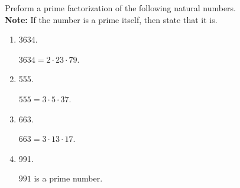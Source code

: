\documentclass[12pt]{article} %
\begin{document}
  \begin{qstn}
    Preform a prime factorization of the following natural numbers.\\
    \textbf{Note:} If the number is a prime itself, then state that it is.
    \begin{enumerate}[label=(\alph*)]
      \item 3634.
        \begin{solution}
          $3634 = 2 \cdot 23 \cdot  79$.
        \end{solution}
      \item 555.
        \begin{solution}
          $555 = 3 \cdot 5 \cdot 37$.
        \end{solution}
      \item 663.
        \begin{solution}
          $663 = 3 \cdot 13 \cdot 17$.
        \end{solution}
      \item 991.
        \begin{solution}
          $991$ is a prime number.
        \end{solution}
    \end{enumerate}
  \end{qstn}
\end{document}
